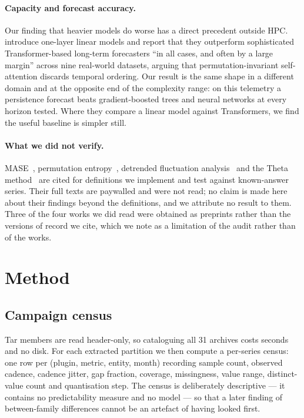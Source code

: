 \documentclass[11pt,a4paper]{article}
\begin{document}
\paragraph{Capacity and forecast accuracy.} Our finding that heavier models do
worse has a direct precedent outside HPC. \citet{zeng2023transformers} introduce
one-layer linear models and report that they outperform sophisticated
Transformer-based long-term forecasters ``in all cases, and often by a large
margin'' across nine real-world datasets, arguing that permutation-invariant
self-attention discards temporal ordering. Our result is the same shape in a
different domain and at the opposite end of the complexity range: on this
telemetry a persistence forecast beats gradient-boosted trees and neural
networks at every horizon tested. Where they compare a linear model against
Transformers, we find the useful baseline is simpler still.

\paragraph{What we did not verify.} MASE~\citep{hyndman2006another}, permutation
entropy~\citep{bandt2002permutation}, detrended fluctuation
analysis~\citep{peng1994mosaic} and the Theta
method~\citep{assimakopoulos2000theta} are cited for definitions we implement
and test against known-answer series. Their full texts are paywalled and were
not read; no claim is made here about their findings beyond the definitions, and
we attribute no result to them. Three of the four works we did read were
obtained as preprints rather than the versions of record we cite, which we note
as a limitation of the audit rather than of the works.

\section{Method}
\label{sec:method}

\subsection{Campaign census}
\label{sec:census-method}

Tar members are read header-only, so cataloguing all 31 archives costs seconds
and no disk. For each extracted partition we then compute a per-series census:
one row per (plugin, metric, entity, month) recording sample count, observed
cadence, cadence jitter, gap fraction, coverage, missingness, value range,
distinct-value count and quantisation step. The census is deliberately
descriptive --- it contains no predictability measure and no model --- so that
a later finding of between-family differences cannot be an artefact of having
looked first.
\end{document}
